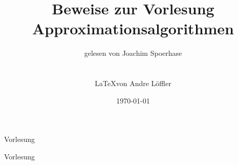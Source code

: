 \documentclass[a4paper,10pt]{article}
\title{Beweise zur Vorlesung Approximationsalgorithmen}
\author{gelesen von Joachim Spoerhase\\ \\ \\ \LaTeX von Andre Löffler}
\date{\today}
\begin{document}
\maketitle
\thispagestyle{empty} %
\tableofcontents

\newpage



\begin{section}{Vorlesung}
\end{section}
\begin{section}{Vorlesung}
\end{section}




\end{document}
